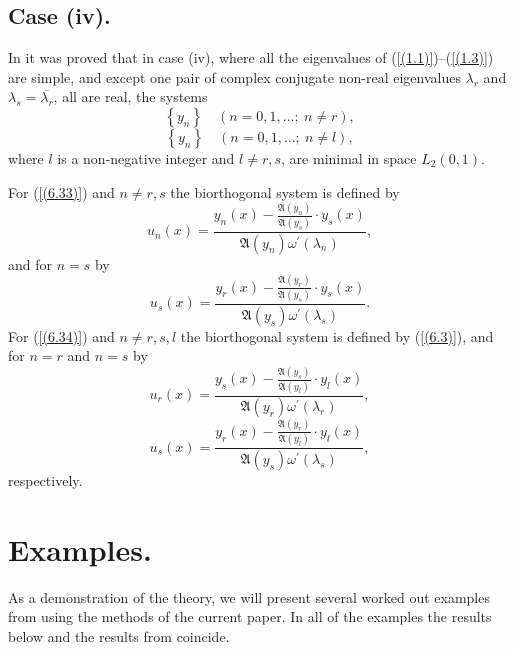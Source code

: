 \documentclass[pdflatex,sn-mathphys-num]{sn-jnl}%
\theoremstyle{thmstyleone}%
\theoremstyle{thmstyletwo}%
\theoremstyle{thmstylethree}%
\theoremstyle{definition}
\theoremstyle{remark}
\numberwithin{equation}{section}
\begin{document}
\subsection{Case (iv).}

In \cite{aliyev5} it was proved that in case (iv), where  all the eigenvalues of (\ref{(1.1)})--(\ref{(1.3)}) are simple, and except one pair of
complex conjugate non-real eigenvalues $\lambda_r$ and $\lambda_s=\overline{\lambda_r}$, all are real, the systems
\begin{equation}
 \left\{ y_n \right\} \quad (n=0,1,\ldots;\ n\neq r),\label{(6.33)}
\end{equation}
\begin{equation}
\left\{ y_n \right\} \quad (n=0,1,\ldots;\ n\neq l), \label{(6.34)}
\end{equation}
where $l$ is a non-negative integer and $l\neq r,s$, are minimal in space $L_2(0,1)$.



 For (\ref{(6.33)}) and $n \ne r,s$ the biorthogonal system is defined by
\begin{equation}
u_n(x)=\frac{y_n(x)-\frac{\mathfrak{A}(y_{n})}{\mathfrak{A}(y_s)}\cdot y_s(x)}{ \mathfrak{A}(y_{n})\omega^\prime(\lambda_n)}
,\label{(6.35)}
\end{equation}
and for $n =s$ by
\begin{equation}
u_s(x)=\frac{y_r(x)-\frac{\mathfrak{A}(y_{r})}{\mathfrak{A}(y_s)}\cdot y_s(x)}{ \mathfrak{A}(y_{s})\omega^\prime(\lambda_s)}
. \label{(6.36)}
\end{equation}
For (\ref{(6.34)}) and $n \ne r,s,l$ the biorthogonal system is defined by (\ref{(6.3)}),
and for $n =r$ and $n =s$ by
\begin{equation}
u_r(x)=\frac{y_s(x)-\frac{\mathfrak{A}(y_{s})}{\mathfrak{A}(y_l)}\cdot y_l(x)}{ \mathfrak{A}(y_{r})\omega^\prime(\lambda_r)}
, \label{(6.37)}
\end{equation}
\begin{equation}
u_s(x)=\frac{y_r(x)-\frac{\mathfrak{A}(y_{r})}{\mathfrak{A}(y_l)}\cdot y_l(x)}{ \mathfrak{A}(y_{s})\omega^\prime(\lambda_s)}
, \label{(6.38)}
\end{equation}
respectively.


\section{Examples.} As a demonstration of the theory, we will present several worked out examples from \cite{aliyev5} using the methods of the current paper. In all of the examples the results below and the results from \cite{aliyev5} coincide.
\end{document}
